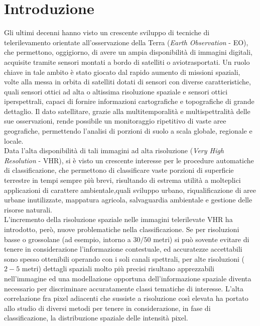 

\chapter*{Introduzione}
\label{Introduzione}

Gli ultimi decenni hanno visto un crescente sviluppo di tecniche di telerilevamento orientate all'osservazione della Terra (\emph{Earth Observation} - EO), che permettono, oggigiorno, di avere un ampia disponibilità di immagini digitali, acquisite tramite sensori montati a bordo di satelliti o aviotrasportati.
Un ruolo chiave in tale ambito è stato giocato dal rapido aumento di missioni spaziali, volte alla messa in orbita di satelliti dotati di sensori con diverse caratteristiche, quali sensori ottici ad alta o altissima risoluzione spaziale e sensori ottici iperspettrali, capaci di fornire informazioni cartografiche e topografiche di grande dettaglio. 
Il dato satellitare, grazie alla multitemporalità e multispettralità delle sue osservazioni, rende possibile un monitoraggio ripetitivo di vaste aree geografiche, permettendo l'analisi di porzioni di suolo a scala globale, regionale e locale.\\
Data l'alta disponibilità di tali immagini ad alta risoluzione (\emph{Very High Resolution} - VHR), si è visto un crescente interesse per le procedure automatiche di classificazione, che permettono di classificare vaste porzioni di superficie terrestre in tempi sempre più brevi, risultando di estrema utilità a molteplici applicazioni di carattere ambientale,quali sviluppo urbano, riqualificazione di aree urbane inutilizzate, mappatura agricola, salvaguardia ambientale e gestione delle risorse naturali.\\
L'incremento della risoluzione spaziale nelle immagini telerilevate VHR ha introdotto, però, nuove problematiche nella classificazione. Se per risoluzioni basse o grossolane (ad esempio, intorno a $30/50$ metri) si può sovente evitare di tenere in considerazione l'informazione contestuale, ed accuratezze accettabili sono spesso ottenibili operando con i soli canali spettrali, per alte risoluzioni ($2-5$ metri) dettagli spaziali molto più precisi risultano apprezzabili nell'immagine ed una modellazione opportuna dell'informazione spaziale diventa necessario per discriminare accuratamente classi tematiche di interesse.
L'alta correlazione fra pixel adiacenti che sussiste a risoluzione così elevata ha portato allo studio di diversi metodi per tenere in considerazione, in fase di classificazione, la distribuzione spaziale delle intensità pixel.\\
